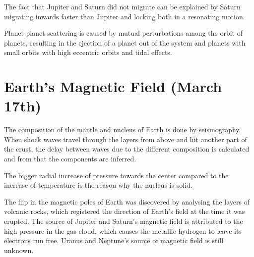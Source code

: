 \documentclass[12pt,a4paper]{article}
\begin{document}
The fact that Jupiter and Saturn did not migrate can be explained by Saturn migrating inwards faster than Jupiter and locking both in a resonating motion.

Planet-planet scattering is caused by mutual perturbations among the orbit of planets, resulting in the ejection of a planet out of the system and planets with small orbits with high eccentric orbits and tidal effects.
\vspace{5mm}

\section{Earth's Magnetic Field (March 17th)}

The composition of the mantle and nucleus of Earth is done by seismography. When shock waves travel through the layers from above and hit another part of the crust, the delay between waves due to the different composition is calculated and from that the components are inferred.

The bigger radial increase of pressure towards the center compared to the increase of temperature is the reason why the nucleus is solid.

The flip in the magnetic poles of Earth was discovered by analysing the layers of volcanic rocks, which registered the direction of Earth's field at the time it was erupted.
The source of Jupiter and Saturn's magnetic field is attributed to the high pressure in the gas cloud, which causes the metallic hydrogen to leave its electrons run free. Uranus and Neptune's source of magnetic field is still unknown.
\end{document}
